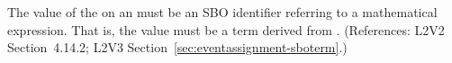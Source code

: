 The value of the   on an \EventAssignment must be an
SBO identifier referring to a mathematical expression.  That is, the value
must be a term derived from \sbomathformula.  (References: L2V2 Section~4.14.2;
L2V3 Section~\ref{sec:eventassignment-sboterm}.)
